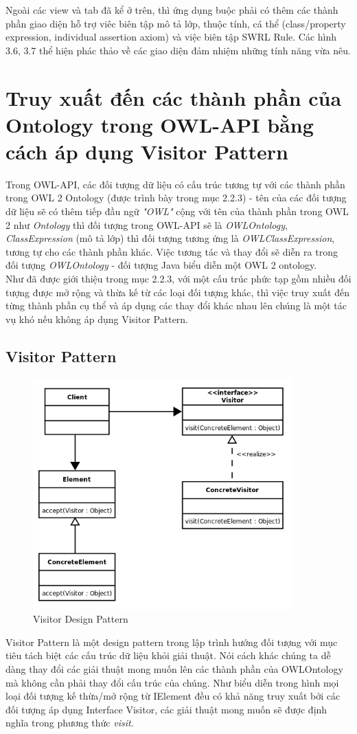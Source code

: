 Ngoài các view và tab đã kể ở trên, thì ứng dụng buộc phải có thêm các thành phần giao diện hỗ trợ viêc biên tập mô tả lớp, thuộc tính, cá thể (class/property expression, individual assertion axiom) và việc biên tập SWRL Rule. Các hình 3.6, 3.7  thể hiện phác thảo về các giao diện đảm nhiệm những tính năng vừa nêu.
\section{Truy xuất đến các thành phần của Ontology trong OWL-API bằng cách áp dụng Visitor Pattern}
Trong OWL-API, các đối tượng dữ liệu có cấu trúc tương tự với các thành phần trong OWL 2 Ontology (được trình bày trong mục 2.2.3) - tên của các đối tượng dữ liệu sẽ có thêm tiếp đầu ngữ \textit{"OWL"} cộng với tên của thành phần trong OWL 2 như \textit{Ontology} thì đối tượng trong OWL-API sẽ là \textit{OWLOntology}, \textit{ClassExpression} (mô tả lớp) thì đối tượng tương ứng là \textit{OWLClassExpression}, tương tự cho các thành phần khác. Việc tương tác và thay đổi sẽ diễn ra trong đối tượng \textit{OWLOntology} - đối tượng Java biểu diễn một OWL 2 ontology. 
\\
Như đã được giới thiệu trong mục 2.2.3, với một cấu trúc phức tạp gồm nhiều đối tượng được mở rộng và thừa kế từ các loại đối tượng khác, thì việc truy xuất đến từng thành phần cụ thể và áp dụng các thay đổi khác nhau lên chúng là một tác vụ khó nếu không áp dụng Visitor Pattern.
\subsection{Visitor Pattern}
\begin{figure}[h!]
	\centering
	\includegraphics[width=100mm]{Figures/visitor_diagram.png}
	\caption{Visitor Design Pattern\label{overflow}}
\end{figure}
Visitor Pattern là một design pattern trong lập trình hướng đối tượng với mục tiêu tách biệt các cấu trúc dữ liệu khỏi giải thuật. Nói cách khác chúng ta dễ dàng thay đổi các giải thuật mong muốn lên các thành phần của OWLOntology mà không cần phải thay đổi cấu trúc của chúng. Như biểu diễn trong hình mọi loại đối tượng kế thừa/mở rộng từ IElement đều có khả năng truy xuất bởi các đối tượng áp dụng Interface Visitor, các giải thuật mong muốn sẽ được định nghĩa trong phương thức \textit{visit}.
